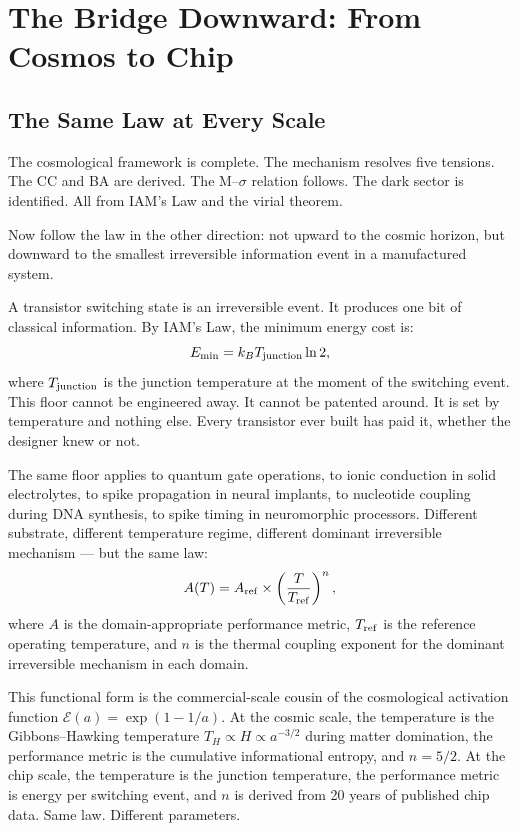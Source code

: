 \documentclass[12pt,a4paper]{article}
\begin{document}
\newpage

\section{The Bridge Downward: From Cosmos to Chip}
\label{sec:bridge}

\subsection{The Same Law at Every Scale}

The cosmological framework is complete. The mechanism resolves five tensions. The
CC and BA are derived. The M--$\sigma$ relation follows. The dark sector is
identified. All from IAM's Law and the virial theorem.

Now follow the law in the other direction: not upward to the cosmic horizon, but
downward to the smallest irreversible information event in a manufactured system.

A transistor switching state is an irreversible event. It produces one bit of
classical information. By IAM's Law, the minimum energy cost is:
\begin{equation}
E_{\rm min} = k_B T_{\rm junction} \ln 2,
\end{equation}
where $T_{\rm junction}$ is the junction temperature at the moment of the
switching event. This floor cannot be engineered away. It cannot be patented
around. It is set by temperature and nothing else. Every transistor ever built
has paid it, whether the designer knew or not.

The same floor applies to quantum gate operations, to ionic conduction in solid
electrolytes, to spike propagation in neural implants, to nucleotide coupling
during DNA synthesis, to spike timing in neuromorphic processors. Different
substrate, different temperature regime, different dominant irreversible
mechanism --- but the same law:
\begin{equation}
A(T) = A_{\rm ref} \times \left(\frac{T}{T_{\rm ref}}\right)^n,
\label{eq:functional_form}
\end{equation}
where $A$ is the domain-appropriate performance metric, $T_{\rm ref}$ is the
reference operating temperature, and $n$ is the thermal coupling exponent for
the dominant irreversible mechanism in each domain.

This functional form is the commercial-scale cousin of the cosmological
activation function $\mathcal{E}(a) = \exp(1-1/a)$. At the cosmic scale, the
temperature is the Gibbons--Hawking temperature $T_H \propto H \propto a^{-3/2}$
during matter domination, the performance metric is the cumulative informational
entropy, and $n = 5/2$. At the chip scale, the temperature is the junction
temperature, the performance metric is energy per switching event, and $n$ is
derived from 20 years of published chip data. Same law. Different parameters.
\end{document}
